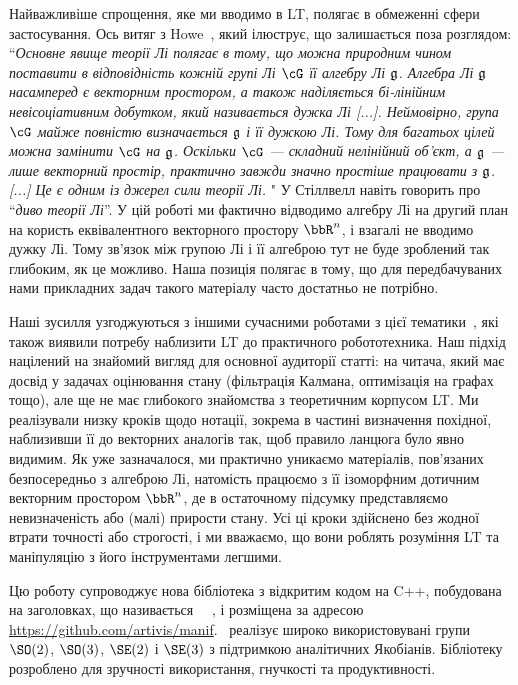 Найважливіше спрощення, яке ми вводимо в LT, полягає в обмеженні сфери застосування.
Ось витяг з
Howe~\cite{Howe-Basic_Lie}, який ілюструє, що залишається поза розглядом:
%
``\emph{Основне явище теорії Лі полягає в тому, що можна природним чином поставити в відповідність кожній групі Лі $\cG$ її алгебру Лі $\frak{g}$.
Алгебра Лі $\frak{g}$ насамперед є векторним простором, а також наділяється бі-лінійним невісоціативним добутком, який називається дужка Лі [...].
Неймовірно, група $\cG$ майже повністю визначається $\frak{g}$ і її дужкою Лі.
Тому для багатьох цілей можна замінити $\cG$ на $\frak{g}$.
Оскільки $\cG$ — складний нелінійний об'єкт, а $\frak{g}$ — лише векторний простір, практично завжди значно простіше працювати з $\frak{g}$.
[...] 
Це є одним із джерел сили теорії Лі.%
}"
%
У 
\cite{STILLWELL-08} Стіллвелл навіть говорить про ``\emph{диво теорії Лі}''.
У цій роботі ми фактично відводимо алгебру Лі на другий план на користь еквівалентного векторного простору $\bbR^n$, і взагалі не вводимо дужку Лі.
Тому зв'язок між групою Лі і її алгеброю тут не буде зроблений так глибоким, як це можливо.
Наша позиція полягає в тому, що для передбачуваних нами прикладних задач такого матеріалу часто достатньо не потрібно.



Наші зусилля узгоджуються з іншими сучасними роботами з цієї тематики~\cite{BARFOOT-17-Estimation,EADE-Lie,forster2017-TRO}, які також виявили потребу наблизити LT до практичного робототехника.
Наш підхід націлений на знайомий вигляд для основної аудиторії статті: на читача, який має досвід у задачах оцінювання стану (фільтрація Калмана, оптимізація на графах тощо), але ще не має глибокого знайомства з теоретичним корпусом LT.
%
Ми реалізували низку кроків щодо нотації, зокрема в частині визначення похідної, наблизивши її до векторних аналогів так, щоб правило ланцюга було явно видимим.
Як уже зазначалося, ми практично уникаємо матеріалів, пов'язаних безпосередньо з алгеброю Лі, натомість працюємо з її ізоморфним дотичним векторним простором $\bbR^n$, де в остаточному підсумку представляємо невизначеність або (малі) прирости стану.
Усі ці кроки здійснено без жодної втрати точності або строгості, і ми вважаємо, що вони роблять розуміння LT та маніпуляцію з його інструментами легшими.

Цю роботу супроводжує нова бібліотека з відкритим кодом на C++, побудована на заголовках, що називається 
\manif\ ~\cite{DERAY-20-manif}, і розміщена за адресою 
\url{https://github.com/artivis/manif}.
\manif\ реалізує широко використовувані групи $\SO(2)$, $\SO(3)$, $\SE(2)$ і $\SE(3)$ з підтримкою аналітичних Якобіанів.
Бібліотеку розроблено для зручності використання, гнучкості та продуктивності.


